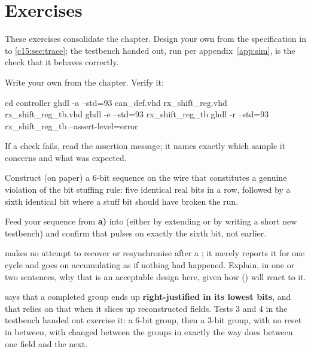 
\section{Exercises}
\label{c15:sec:exercises}

\begin{aside}
These exercises consolidate the chapter. Design your own  from the
specification in  to \ref{c15:sec:trace}; the testbench handed out, run per
appendix~\ref{app:sim}, is the check that it behaves correctly.
\end{aside}

\label{c15:ex:rxsr}
Write your own  from the chapter. Verify it:

\begin{shell}
cd controller
ghdl -a --std=93 can_def.vhd rx_shift_reg.vhd rx_shift_reg_tb.vhd
ghdl -e --std=93 rx_shift_reg_tb
ghdl -r --std=93 rx_shift_reg_tb --assert-level=error
\end{shell}

If a check fails, read the assertion message; it names exactly which sample it concerns and what was
expected.

\label{c15:ex:violation}
 Construct (on paper) a 6-bit sequence on the wire that constitutes a genuine violation of
the bit stuffing rule: five identical real bits in a row, followed by a sixth identical bit where a
stuff bit should have broken the run.

 Feed your sequence from \textbf{a)} into  (either by extending
 or by writing a short new testbench) and confirm that 
pulses on exactly the sixth bit, not earlier.

  makes no attempt to recover or resynchronise after a
; it merely reports it for one cycle and goes on accumulating as if nothing had
happened. Explain, in one or two sentences, why that is an acceptable design here, given how
 () will react to it.

\label{c15:ex:justify}
 says that a completed group ends up \textbf{right-justified in its lowest
 bits}, and that  relies on that when it slices up reconstructed
fields. Tests 3 and 4 in the testbench handed out exercise it: a 6-bit group, then a 3-bit group, with
no reset in between, with  changed between the groups in exactly the way
 does between one field and the next.

